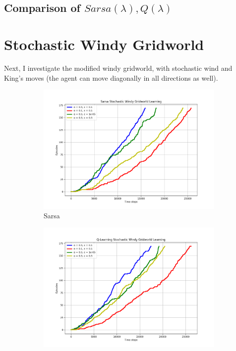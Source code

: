\documentclass{article}
\begin{document}
\subsection{Comparison of $Sarsa(\lambda), Q(\lambda)$}

\section{Stochastic Windy Gridworld}
Next, I investigate the modified windy gridworld, with stochastic wind and King's moves (the agent can move diagonally in all directions as well).

\begin{figure}[h!]
  \centering
  \begin{subfigure}{0.45\textwidth} 
    \includegraphics[width=\textwidth]{sarsa_stochastic.png}
    \caption{Sarsa}
  \end{subfigure}
  \hspace{0.05\textwidth}  
  \begin{subfigure}{0.45\textwidth}  
    \includegraphics[width=\textwidth]{q_stochastic.png}

\end{subfigure}
\end{figure}
\end{document}
